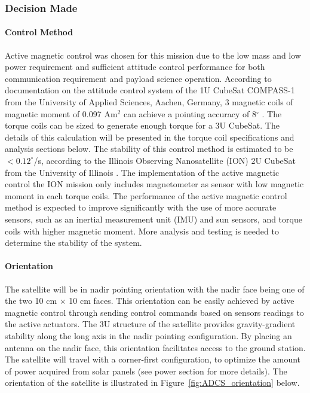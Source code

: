 \documentclass[12pt]{article}
\begin{document}
					\subsubsection{Decision Made}
				\paragraph{Control Method}
				Active magnetic control was chosen for this mission due to the low mass and low power requirement and sufficient attitude control performance for both communication requirement and payload science operation. According to documentation on the attitude control system of the 1U CubeSat COMPASS-1 from the University of Applied Sciences, Aachen, Germany, 3 magnetic coils of magnetic moment of  0.097 Am$^2$ can achieve a pointing accuracy of 8$^\circ$ \cite{adcs_compass}. The torque coils can be sized to generate enough torque for a 3U CubeSat. The details of this calculation will be presented in the torque coil specifications and analysis sections below. The stability of this control method is estimated to be $< 0.12^\circ$/s, according to the Illinois Observing Nanosatellite (ION) 2U CubeSat from the University of Illinois \cite{adcs_ion}. The implementation of the active magnetic control the ION mission only includes magnetometer as sensor with low magnetic moment in each torque coils. The performance of the active magnetic control method is expected to improve significantly with the use of more accurate sensors, such as an inertial measurement unit (IMU) and sun sensors, and torque coils with higher magnetic moment. More analysis and testing is needed to determine the stability of the system. 

				\paragraph{Orientation}
				The satellite will be in nadir pointing orientation with the nadir face being one of the two 10 cm $\times$ 10 cm faces. This orientation can be easily achieved by active magnetic control through sending control commands based on sensors readings to the active actuators. The 3U structure of the satellite provides gravity-gradient stability along the long axis in the nadir pointing configuration. By placing an antenna on the nadir face, this orientation facilitates access to the ground station. The satellite will travel with a corner-first configuration, to optimize the amount of power acquired from solar panels (see power section for more details). The orientation of the satellite is illustrated in Figure~\ref{fig:ADCS_orientation} below. 
			
\end{document}
